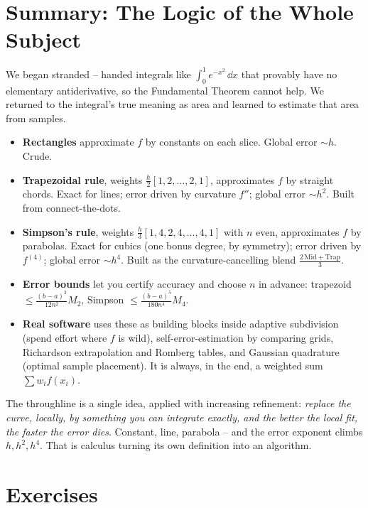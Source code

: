 \section{Summary: The Logic of the Whole Subject}
\label{ch27:summary}

We began stranded -- handed integrals like $\int_0^1 e^{-x^2}\,\dd x$ that provably have no elementary antiderivative, so the Fundamental Theorem cannot help. We returned to the integral's true meaning as area and learned to estimate that area from samples.

\begin{itemize}
\item \textbf{Rectangles} approximate $f$ by constants on each slice. Global error $\sim h$. Crude.
\item \textbf{Trapezoidal rule}, weights $\tfrac{h}{2}[1,2,\dots,2,1]$, approximates $f$ by straight chords. Exact for lines; error driven by curvature $f''$; global error $\sim h^2$. Built from connect-the-dots.
\item \textbf{Simpson's rule}, weights $\tfrac{h}{3}[1,4,2,4,\dots,4,1]$ with $n$ even, approximates $f$ by parabolas. Exact for cubics (one bonus degree, by symmetry); error driven by $f^{(4)}$; global error $\sim h^4$. Built as the curvature-cancelling blend $\tfrac{2\,\text{Mid} + \text{Trap}}{3}$.
\item \textbf{Error bounds} let you certify accuracy and choose $n$ in advance: trapezoid $\le \tfrac{(b-a)^3}{12n^2}M_2$, Simpson $\le \tfrac{(b-a)^5}{180n^4}M_4$.
\item \textbf{Real software} uses these as building blocks inside adaptive subdivision (spend effort where $f$ is wild), self-error-estimation by comparing grids, Richardson extrapolation and Romberg tables, and Gaussian quadrature (optimal sample placement). It is always, in the end, a weighted sum $\sum w_i f(x_i)$.
\end{itemize}

The throughline is a single idea, applied with increasing refinement: \emph{replace the curve, locally, by something you can integrate exactly, and the better the local fit, the faster the error dies}. Constant, line, parabola -- and the error exponent climbs $h, h^2, h^4$. That is calculus turning its own definition into an algorithm.

\section{Exercises}
\label{ch27:exercises}

